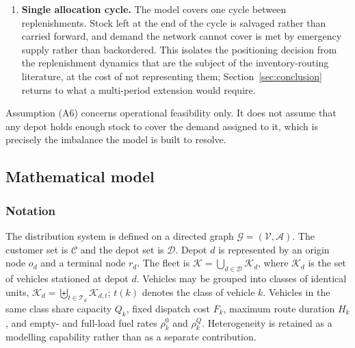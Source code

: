 \documentclass[authoryear,final,3p,times]{elsarticle}
\theoremstyle{definition}
\theoremstyle{plain}
\begin{document}
\begin{enumerate}[label=(A\arabic*),leftmargin=*]
\item \textbf{Single allocation cycle.} The model covers one cycle between
replenishments. Stock left at the end of the cycle is salvaged rather than
carried forward, and demand the network cannot cover is met by emergency supply
rather than backordered. This isolates the positioning decision from the
replenishment dynamics that are the subject of the inventory-routing
literature, at the cost of not representing them; Section~\ref{sec:conclusion}
returns to what a multi-period extension would require.
\end{enumerate}

Assumption (A6) concerns operational feasibility only. It does not assume that
any depot holds enough stock to cover the demand assigned to it, which is
precisely the imbalance the model is built to resolve.

\subsection{Mathematical model}
\label{subsec:mathematical_formulation}

\subsubsection{Notation}

The distribution system is defined on a directed graph
$\mathcal G=(\mathcal V,\mathcal A)$.  The customer set is $\mathcal C$ and the
depot set is $\mathcal D$.  Depot $d$ is represented by an origin node $o_d$
and a terminal node $r_d$.  The fleet is
$\mathcal K=\bigcup_{d\in\mathcal D}\mathcal K_d$, where $\mathcal K_d$ is the
set of vehicles stationed at depot $d$.  Vehicles may be grouped into classes
of identical units, $\mathcal K_d=\biguplus_{t\in\mathcal T_d}\mathcal K_{d,t}$;
$t(k)$ denotes the class of vehicle $k$.  Vehicles in the same class share
capacity $Q_k$, fixed dispatch cost $F_k$, maximum route duration $H_k$, and
empty- and full-load fuel rates $\rho_k^0$ and $\rho_k^Q$.  Heterogeneity is
retained as a modelling capability rather than as a separate contribution.
\end{document}
